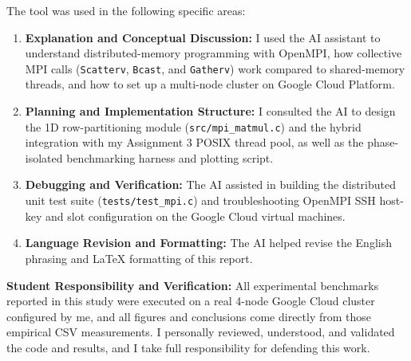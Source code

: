 \documentclass[11pt,a4paper]{article}
\begin{document}
The tool was used in the following specific areas:
\begin{enumerate}
    \item \textbf{Explanation and Conceptual Discussion:} I used the AI assistant to understand distributed-memory programming with OpenMPI, how collective MPI calls (\texttt{Scatterv}, \texttt{Bcast}, and \texttt{Gatherv}) work compared to shared-memory threads, and how to set up a multi-node cluster on Google Cloud Platform.
    \item \textbf{Planning and Implementation Structure:} I consulted the AI to design the 1D row-partitioning module (\texttt{src/mpi\_matmul.c}) and the hybrid integration with my Assignment 3 POSIX thread pool, as well as the phase-isolated benchmarking harness and plotting script.
    \item \textbf{Debugging and Verification:} The AI assisted in building the distributed unit test suite (\texttt{tests/test\_mpi.c}) and troubleshooting OpenMPI SSH host-key and slot configuration on the Google Cloud virtual machines.
    \item \textbf{Language Revision and Formatting:} The AI helped revise the English phrasing and \LaTeX{} formatting of this report.
\end{enumerate}

\textbf{Student Responsibility and Verification:}
All experimental benchmarks reported in this study were executed on a real 4-node Google Cloud cluster configured by me, and all figures and conclusions come directly from those empirical CSV measurements. I personally reviewed, understood, and validated the code and results, and I take full responsibility for defending this work.
\end{document}
